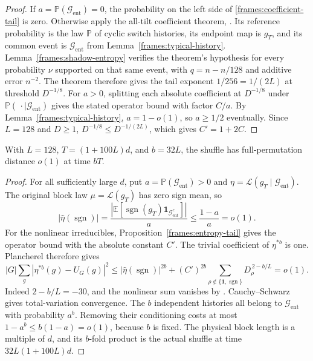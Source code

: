 \begin{proof}
If $a=\mathbb P(\mathcal G_{\mathrm{ent}})=0$, the probability on the left side of
\eqref{frames:coefficient-tail} is zero. Otherwise apply the all-tilt
coefficient theorem, \cite[Theorem~]{partial-fourier}.
Its reference probability is the law $\mathbb P$ of cyclic switch
histories, its endpoint map is $g_T$, and its common event is
$\mathcal G_{\mathrm{ent}}$ from Lemma~\ref{frames:typical-history}.
Lemma~\ref{frames:shadow-entropy} verifies the theorem's hypothesis
for every probability $\nu$ supported on that same event, with
$q=n-n/128$ and additive error $n^{-2}$. The theorem therefore gives
the tail exponent $1/256=1/(2L)$ at threshold $D^{-1/8}$.
For $a>0$, splitting each absolute coefficient at $D^{-1/8}$ under
$\mathbb P(\,\cdot\mid\mathcal G_{\mathrm{ent}})$ gives the stated operator bound
with factor $C/a$. By Lemma~\ref{frames:typical-history},
$a=1-o(1)$, so $a\ge1/2$ eventually. Since $L=128$ and $D\ge1$,
$D^{-1/8}\le D^{-1/(2L)}$, which gives $C'=1+2C$.
\end{proof}

\begin{proposition}
\label{frames:entropy-application}
With $L=128$, $T=(1+100L)d$, and $b=32L$, the shuffle has
full-permutation distance $o(1)$ at time $bT$.
\end{proposition}

\begin{proof}
For all sufficiently large $d$, put $a=\mathbb P(\mathcal G_{\mathrm{ent}})>0$
and $\eta=\mathcal L(g_T\mid\mathcal G_{\mathrm{ent}})$. The original block law
$\mu=\mathcal L(g_T)$ has zero sign mean, so
\[
 |\widehat\eta(\operatorname{sgn})|
 =\frac{|\mathbb E[\operatorname{sgn}(g_T)\mathbf1_{\mathcal G_{\mathrm{ent}}^c}]|}{a}
 \le\frac{1-a}{a}=o(1).
\]
For the nonlinear irreducibles, Proposition~\ref{frames:entropy-tail}
gives the operator bound with the absolute constant $C'$. The trivial
coefficient of $\eta^{*b}$ is one. Plancherel therefore gives
\[
 |G|\sum_g|\eta^{*b}(g)-U_G(g)|^2
 \le |\widehat\eta(\operatorname{sgn})|^{2b}
       +(C')^{2b}\sum_{\rho\notin\{\mathbf1,\operatorname{sgn}\}}
                   D_\rho^{\,2-b/L}=o(1).
\]
Indeed $2-b/L=-30$, and the nonlinear sum vanishes by
\cite[Lemma~]{partial-fourier}.
Cauchy--Schwarz gives total-variation convergence.
The $b$ independent histories all belong to $\mathcal G_{\mathrm{ent}}$ with
probability $a^b$. Removing their conditioning costs at most
$1-a^b\le b(1-a)=o(1)$, because $b$ is fixed.
The physical block length is a multiple of $d$, and its $b$-fold
product is the actual shuffle at time $32L(1+100L)d$.
\end{proof}

